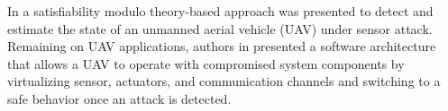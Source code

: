 \documentclass[letterpaper, 10 pt, conference]{ieeeconf}  %
\newcommand\NB[1]{$\spadesuit$\footnote{NB: #1}}
\begin{document}
In \cite{shoukry2015secure} a satisfiability modulo theory-based approach was presented to detect and estimate the state of an unmanned aerial vehicle (UAV) under sensor attack. Remaining on UAV applications, authors in \cite{yoon2017virtualdrone} presented a software architecture that allows a UAV to operate with compromised system components by virtualizing sensor, actuators, and communication channels and switching to a safe behavior once an attack is detected. 

\end{document}
